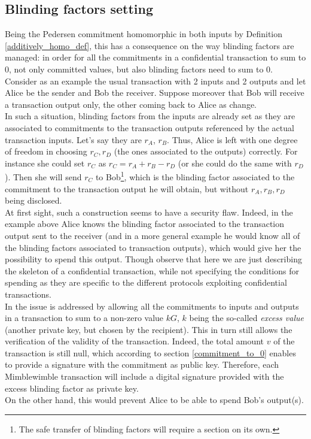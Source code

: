 \subsection{Blinding factors setting}
\label{sec::blinding_factors_setting}
Being the Pedersen commitment homomorphic in both inputs by Definition \ref{additively_homo_def}, this has a consequence on the way blinding factors are managed: in order for all the commitments in a confidential transaction to sum to 0, not only committed values, but also blinding factors need to sum to 0.\\
Consider as an example the usual transaction with 2 inputs and 2 outputs and let Alice be the sender and Bob the receiver. Suppose moreover that Bob will receive a transaction output only, the other coming back to Alice as change.\\
In such a situation, blinding factors from the inputs are already set as they are associated to commitments to the transaction outputs referenced by the actual transaction inputs. Let's say they are $r_A$, $r_B$. Thus, Alice is left with one degree of freedom in choosing $r_C, r_D$ (the ones associated to the outputs) correctly. For instance she could set $r_C$ as $r_C = r_A + r_B - r_D$ (or she could do the same with $r_D$). Then she will send $r_C$ to Bob\footnote{The safe transfer of blinding factors will require a section on its own.}, which is the blinding factor associated to the commitment to the transaction output he will obtain, but without $r_A, r_B, r_D$ being disclosed.\\
At first sight, such a construction seems to have a security flaw. Indeed, in the example above Alice knows the blinding factor associated to the transaction output sent to the receiver (and in a more general example he would know all of the blinding factors associated to transaction outputs), which would give her the possibility to spend this output. Though observe that here we are just describing the skeleton of a confidential transaction, while not specifying the conditions for spending as they are specific to the different protocols exploiting confidential transactions.\\
In \cite{MW, PoeMW} the issue is addressed by allowing all the commitments to inputs and outputs in a transaction to sum to a non-zero value $kG$, $k$ being the so-called \textit{excess value} (another private key, but chosen by the recipient). This in turn still allows the verification of the validity of the transaction. Indeed, the total amount $v$ of the transaction is still null, which according to section \ref{commitment_to_0} enables to provide a signature with the commitment as public key. Therefore, each Mimblewimble transaction will include a digital signature provided with the excess blinding factor as private key.\\
On the other hand, this would prevent Alice to be able to spend Bob's output(s).

